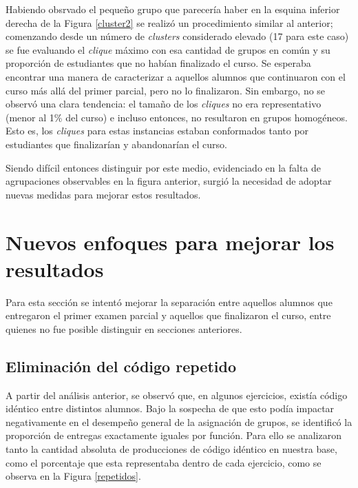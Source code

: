 \documentclass[11pt,a4paper,twoside,openany]{tesis}
\begin{document}
Habiendo obsrvado el pequeño grupo que parecería haber en la esquina inferior derecha de la Figura \ref {cluster2} se realizó un procedimiento similar al anterior; comenzando desde un número de \emph{clusters} considerado elevado (17 para este caso) se fue evaluando el \emph{clique} máximo con esa cantidad de grupos en común y su proporción de estudiantes que no habían finalizado el curso. Se esperaba encontrar una manera de caracterizar a aquellos alumnos que continuaron con el curso más allá del primer parcial, pero no lo finalizaron. Sin embargo, no se observó una clara tendencia: el tamaño de los \emph{cliques} no era representativo (menor al 1\% del curso) e incluso entonces, no resultaron en grupos homogéneos. Esto es, los \emph{cliques} para estas instancias estaban conformados tanto por estudiantes que finalizarían y abandonarían el curso.

Siendo difícil entonces distinguir por este medio, evidenciado en la falta de agrupaciones observables en la figura anterior, surgió la necesidad de adoptar nuevas medidas para mejorar estos resultados. 

\section{Nuevos enfoques para mejorar los resultados}

Para esta sección se intentó mejorar la separación entre aquellos alumnos que entregaron el primer examen parcial y aquellos que finalizaron el curso, entre quienes no fue posible distinguir en secciones anteriores. 

\subsection{Eliminación del código repetido}

A partir del análisis anterior, se observó que, en algunos ejercicios, existía código idéntico entre distintos alumnos. Bajo la sospecha de que esto podía impactar negativamente en el desempeño general de la asignación de grupos, se identificó la proporción de entregas exactamente iguales por función. Para ello se analizaron tanto la cantidad absoluta de producciones de código idéntico en nuestra base, como el porcentaje que esta representaba dentro de cada ejercicio, como se observa en la Figura \ref{repetidos}. 
\end{document}
